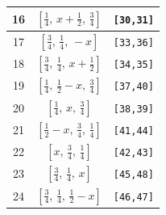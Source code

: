 \documentclass[fleqn,8pt]{jsarticle}
\begin{document}
\begin{longtable}{ccc}
16 & $\left[ \frac{1}{4},\, x + \frac{1}{2},\, \frac{3}{4} \right]$ & {\tt [30,31]} \\ \hline
17 & $\left[ \frac{3}{4},\, \frac{1}{4},\, - x \right]$ & {\tt [33,36]} \\ \hline
18 & $\left[ \frac{3}{4},\, \frac{1}{4},\, x + \frac{1}{2} \right]$ & {\tt [34,35]} \\ \hline
19 & $\left[ \frac{1}{4},\, \frac{1}{2} - x,\, \frac{3}{4} \right]$ & {\tt [37,40]} \\ \hline
20 & $\left[ \frac{1}{4},\, x,\, \frac{3}{4} \right]$ & {\tt [38,39]} \\ \hline
21 & $\left[ \frac{1}{2} - x,\, \frac{3}{4},\, \frac{1}{4} \right]$ & {\tt [41,44]} \\ \hline
22 & $\left[ x,\, \frac{3}{4},\, \frac{1}{4} \right]$ & {\tt [42,43]} \\ \hline
23 & $\left[ \frac{3}{4},\, \frac{1}{4},\, x \right]$ & {\tt [45,48]} \\ \hline
24 & $\left[ \frac{3}{4},\, \frac{1}{4},\, \frac{1}{2} - x \right]$ & {\tt [46,47]} \\
\end{longtable}
\renewcommand{\arraystretch}{1.2}
\end{document}
